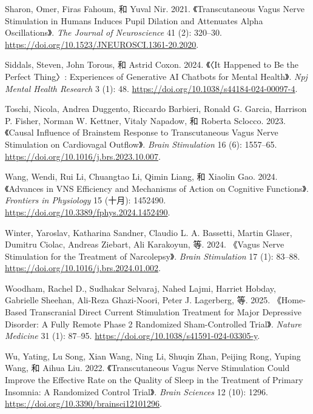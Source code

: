 \documentclass[
  Letterpaper,
]{scrbook}
\newlength{\cslhangindent}
\newenvironment{CSLReferences}[2] %
 {\begin{list}{}{%
  \setlength{\itemindent}{0pt}
  \setlength{\leftmargin}{0pt}
  \setlength{\parsep}{0pt}
  \ifodd #1
   \setlength{\leftmargin}{\cslhangindent}
   \setlength{\itemindent}{-1\cslhangindent}
  \fi
  \setlength{\itemsep}{#2\baselineskip}}}
 {\end{list}}
\begin{document}
\begin{CSLReferences}{1}{0}
Sharon, Omer, Firas Fahoum, 和 Yuval Nir. 2021. {《Transcutaneous {Vagus
Nerve Stimulation} in {Humans Induces Pupil Dilation} and {Attenuates
Alpha Oscillations}》}. \emph{The Journal of Neuroscience} 41 (2):
320--30. \url{https://doi.org/10.1523/JNEUROSCI.1361-20.2020}.

Siddals, Steven, John Torous, 和 Astrid Coxon. 2024. {《{〈{It} Happened
to Be the Perfect Thing〉}: Experiences of Generative {AI} Chatbots for
Mental Health》}. \emph{Npj Mental Health Research} 3 (1): 48.
\url{https://doi.org/10.1038/s44184-024-00097-4}.

Toschi, Nicola, Andrea Duggento, Riccardo Barbieri, Ronald G. Garcia,
Harrison P. Fisher, Norman W. Kettner, Vitaly Napadow, 和 Roberta
Sclocco. 2023. {《Causal Influence of Brainstem Response to
Transcutaneous Vagus Nerve Stimulation on Cardiovagal Outflow》}.
\emph{Brain Stimulation} 16 (6): 1557--65.
\url{https://doi.org/10.1016/j.brs.2023.10.007}.

Wang, Wendi, Rui Li, Chuangtao Li, Qimin Liang, 和 Xiaolin Gao. 2024.
{《Advances in {VNS} Efficiency and Mechanisms of Action on Cognitive
Functions》}. \emph{Frontiers in Physiology} 15 (十月): 1452490.
\url{https://doi.org/10.3389/fphys.2024.1452490}.

Winter, Yaroslav, Katharina Sandner, Claudio L. A. Bassetti, Martin
Glaser, Dumitru Ciolac, Andreas Ziebart, Ali Karakoyun, 等. 2024.
{《Vagus Nerve Stimulation for the Treatment of Narcolepsy》}.
\emph{Brain Stimulation} 17 (1): 83--88.
\url{https://doi.org/10.1016/j.brs.2024.01.002}.

Woodham, Rachel D., Sudhakar Selvaraj, Nahed Lajmi, Harriet Hobday,
Gabrielle Sheehan, Ali-Reza Ghazi-Noori, Peter J. Lagerberg, 等. 2025.
{《Home-Based Transcranial Direct Current Stimulation Treatment for
Major Depressive Disorder: A Fully Remote Phase 2 Randomized
Sham-Controlled Trial》}. \emph{Nature Medicine} 31 (1): 87--95.
\url{https://doi.org/10.1038/s41591-024-03305-y}.

Wu, Yating, Lu Song, Xian Wang, Ning Li, Shuqin Zhan, Peijing Rong,
Yuping Wang, 和 Aihua Liu. 2022. {《Transcutaneous {Vagus Nerve
Stimulation Could Improve} the {Effective Rate} on the {Quality} of
{Sleep} in the {Treatment} of {Primary Insomnia}: {A Randomized Control
Trial}》}. \emph{Brain Sciences} 12 (10): 1296.
\url{https://doi.org/10.3390/brainsci12101296}.


\end{CSLReferences}
\end{document}
